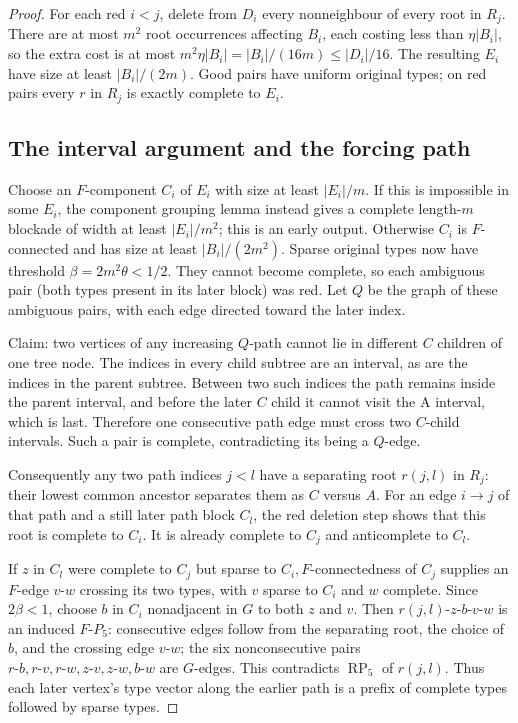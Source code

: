 \documentclass[11pt,a4paper]{article}
\theoremstyle{definition}
\theoremstyle{remark}
\numberwithin{equation}{section}
\begin{document}
\begin{proof}
For each red \(i<j\), delete from \(D_{i}\) every nonneighbour of every root in \(R_{j}\). There are at most \(m^{2}\) root occurrences affecting \(B_{i}\), each costing less than \(\eta|B_{i}|\), so the extra cost is at most \(m^{2} \eta|B_{i}|=|B_{i}|/(16m)\le\allowbreak |D_{i}|/16\). The resulting \(E_{i}\) have size at least \(|B_{i}|/(2m)\). Good pairs have uniform original types; on red pairs every \(r\) in \(R_{j}\) is exactly complete to \(E_{i}\).
\subsection{The interval argument and the forcing path}\label{subsec:rp5-interval}
Choose an \(F\)-component \(C_{i}\) of \(E_{i}\) with size at least \(|E_{i}|/m\). If this is impossible in some \(E_{i}\), the component grouping lemma instead gives a complete length-\(m\) blockade of width at least \(|E_{i}|/m^{2}\); this is an early output. Otherwise \(C_{i}\) is \(F\)-connected and has size at least \(|B_{i}|/(2m^{2})\). Sparse original types now have threshold \(\beta=2m^{2} \theta<1/2\). They cannot become complete, so each ambiguous pair (both types present in its later block) was red. Let \(Q\) be the graph of these ambiguous pairs, with each edge directed toward the later index.

Claim: two vertices of any increasing \(Q\)-path cannot lie in different \(C\) children of one tree node. The indices in every child subtree are an interval, as are the indices in the parent subtree. Between two such indices the path remains inside the parent interval, and before the later \(C\) child it cannot visit the A interval, which is last. Therefore one consecutive path edge must cross two \(C\)-child intervals. Such a pair is complete, contradicting its being a \(Q\)-edge.

Consequently any two path indices \(j<l\) have a separating root \(r(j,\allowbreak l)\) in \(R_{j}\): their lowest common ancestor separates them as \(C\) versus \(A\). For an edge \(i\to j\) of that path and a still later path block \(C_{l}\), the red deletion step shows that this root is complete to \(C_{i}\). It is already complete to \(C_{j}\) and anticomplete to \(C_{l}\).

If \(z\) in \(C_{l}\) were complete to \(C_{j}\) but sparse to \(C_{i},\allowbreak  F\)-connectedness of \(C_{j}\) supplies an \(F\)-edge \(v\text{-}w\) crossing its two types, with \(v\) sparse to \(C_{i}\) and \(w\) complete. Since \(2\beta<1\), choose \(b\) in \(C_{i}\) nonadjacent in \(G\) to both \(z\) and \(v\). Then \(r(j,\allowbreak l)\text{-}z\text{-}b\text{-}v\text{-}w\) is an induced \(F\text{-}P_{5}\): consecutive edges follow from the separating root, the choice of \(b\), and the crossing edge \(v\text{-}w\); the six nonconsecutive pairs \(r\text{-}b,\allowbreak r\text{-}v,\allowbreak r\text{-}w,\allowbreak z\text{-}v,\allowbreak z\text{-}w,\allowbreak b\text{-}w\) are \(G\)-edges. This contradicts \(\operatorname{RP}_{5}\) of \(r(j,\allowbreak l)\). Thus each later vertex's type vector along the earlier path is a prefix of complete types followed by sparse types.


\end{proof}
\end{document}
